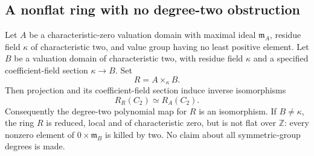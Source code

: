 \subsection{A nonflat ring with no degree-two obstruction}

\begin{proposition}
\label{C:nondiscrete-torsion-C2}
Let $A$ be a characteristic-zero valuation domain with maximal ideal
$\mathfrak m_A$, residue field $\kappa$ of characteristic two, and value
group having no least positive element. Let $B$ be a valuation domain
of characteristic two, with residue field $\kappa$ and a specified
coefficient-field section $\kappa\to B$. Set
\[
                         R=A\times_\kappa B.
\]
Then projection and its coefficient-field section induce inverse
isomorphisms
\[
                       R_R(C_2)\simeq R_A(C_2).
\]
Consequently the degree-two polynomial map for $R$ is an isomorphism.
If $B\ne\kappa$, the ring $R$ is reduced, local and of characteristic
zero, but is not flat over $\mathbb Z$: every nonzero element of
$0\times\mathfrak m_B$ is killed by two.
No claim about all symmetric-group degrees is made.
\end{proposition}
